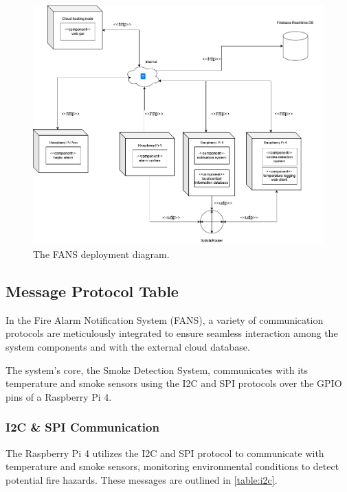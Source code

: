 \begin{figure}
    \centering
    \includegraphics[width=\imagewidth]{../assets/FANSDeployment.png}
    \caption{The FANS deployment diagram.}
    \label{fig:deployment}
\end{figure}

\subsection{Message Protocol Table}

In the Fire Alarm Notification System (FANS), a variety of communication protocols are meticulously integrated to
ensure seamless interaction among the system components and with the external cloud database.

The system’s core, the Smoke Detection System, communicates with its temperature and smoke sensors using the I2C and
SPI protocols over the GPIO pins of a Raspberry Pi 4.

\subsubsection{I2C \& SPI Communication}

The Raspberry Pi 4 utilizes the I2C and SPI protocol to communicate with temperature and smoke sensors, monitoring
environmental conditions to detect potential fire hazards. These messages are outlined in \ref{table:i2c}.

